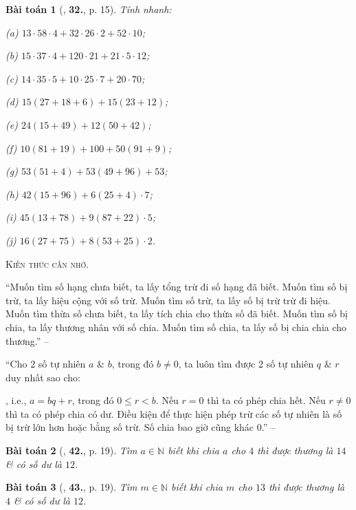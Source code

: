 \documentclass{article}
\numberwithin{equation}{section}
\newtheorem{baitoan}{Bài toán}[section]
\begin{document}
\begin{baitoan}[\cite{Trong_Toan_6_2021}, \textbf{32.}, p. 15]
	Tính nhanh:
	\begin{enumerate*}
		\item[(a)] $13\cdot 58\cdot 4 + 32\cdot 26\cdot 2 + 52\cdot 10$;
		\item[(b)] $15\cdot 37\cdot 4 + 120\cdot 21 + 21\cdot 5\cdot 12$;
		\item[(c)] $14\cdot 35\cdot 5 + 10\cdot 25\cdot 7 + 20\cdot 70$;
		\item[(d)] $15(27 + 18 + 6) + 15(23 + 12)$;
		\item[(e)] $24(15 + 49) + 12(50 + 42)$;
		\item[(f)] $10(81 + 19) + 100 + 50(91 + 9)$;
		\item[(g)] $53(51 + 4) + 53(49 + 96) + 53$;
		\item[(h)] $42(15 + 96) + 6(25 + 4)\cdot 7$;
		\item[(i)] $45(13 + 78) + 9(87 + 22)\cdot 5$;
		\item[(j)] $16(27 + 75) + 8(53 + 25)\cdot 2$.
	\end{enumerate*}
\end{baitoan}
\noindent\textsc{Kiến thức cần nhớ.}
\begin{tcolorbox}
	``Muốn tìm số hạng chưa biết, ta lấy tổng trừ đi số hạng đã biết. Muốn tìm số bị trừ, ta lấy hiệu cộng với số trừ. Muốn tìm số trừ, ta lấy số bị trừ trừ đi hiệu. Muốn tìm thừa số chưa biết, ta lấy tích chia cho thừa số đã biết. Muốn tìm số bị chia, ta lấy thương nhân với số chia. Muốn tìm số chia, ta lấy số bị chia chia cho thương.'' -- \cite[p. 16]{Trong_Toan_6_2021}
	
	``Cho 2 số tự nhiên $a$ \& $b$, trong đó $b\ne 0$, ta luôn tìm được 2 số tự nhiên $q$ \& $r$ duy nhất sao cho:
	
	, i.e., $a = bq + r$, trong đó $0\le r < b$. Nếu $r = 0$ thì ta có phép chia hết. Nếu $r\ne 0$ thì ta có phép chia có dư. Điều kiện để thực hiện phép trừ các số tự nhiên là số bị trừ lớn hơn hoặc bằng số trừ. Số chia bao giờ cũng khác $0$.'' -- \cite[p. 18]{Trong_Toan_6_2021}
\end{tcolorbox}

\begin{baitoan}[\cite{Trong_Toan_6_2021}, \textbf{42.}, p. 19]
	Tìm $a\in\mathbb{N}$ biết khi chia $a$ cho $4$ thì được thương là $14$ \& có số dư là $12$.
\end{baitoan}

\begin{baitoan}[\cite{Trong_Toan_6_2021}, \textbf{43.}, p. 19]
	Tìm $m\in\mathbb{N}$ biết khi chia $m$ cho $13$ thì được thương là $4$ \& có số dư là $12$.
\end{baitoan}
\end{document}
